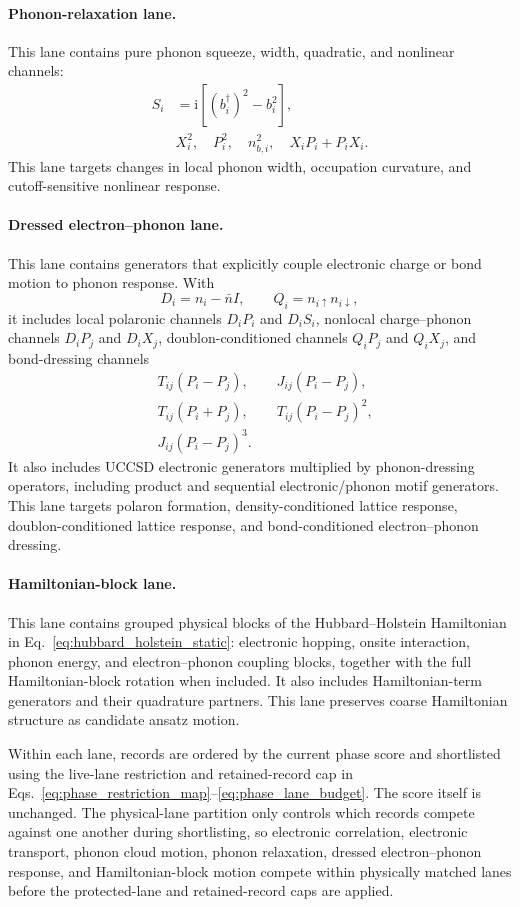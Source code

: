 \documentclass[
  reprint,
  amsmath,
  amssymb,
  aps,
  pra,
  nofootinbib,
  superscriptaddress,
  floatfix
]{revtex4-2}
\newcommand{\ii}{\mathrm{i}}
\begin{document}
\paragraph*{Phonon-relaxation lane.}
This lane contains pure phonon squeeze, width, quadratic, and nonlinear
channels:
\begin{align*}
S_i&=\ii[(b_i^\dagger)^2-b_i^2],\\
&X_i^2,\quad P_i^2,\quad n_{b,i}^2,\quad
X_iP_i+P_iX_i .
\end{align*}
This lane targets changes in local phonon width, occupation curvature, and
cutoff-sensitive nonlinear response.

\paragraph*{Dressed electron--phonon lane.}
This lane contains generators that explicitly couple electronic charge or bond
motion to phonon response. With
\[
D_i=n_i-\bar n I,
\qquad
Q_i=n_{i\uparrow}n_{i\downarrow},
\]
it includes local polaronic channels \(D_iP_i\) and \(D_iS_i\), nonlocal
charge--phonon channels \(D_iP_j\) and \(D_iX_j\), doublon-conditioned channels
\(Q_iP_j\) and \(Q_iX_j\), and bond-dressing channels
\begin{align*}
&T_{ij}(P_i-P_j),
\qquad
J_{ij}(P_i-P_j),\\
&T_{ij}(P_i+P_j),
\qquad
T_{ij}(P_i-P_j)^2,\\
&J_{ij}(P_i-P_j)^3 .
\end{align*}
It also includes UCCSD electronic generators multiplied by phonon-dressing
operators, including product and sequential electronic/phonon motif generators.
This lane targets polaron formation, density-conditioned lattice response,
doublon-conditioned lattice response, and bond-conditioned electron--phonon
dressing.

\paragraph*{Hamiltonian-block lane.}
This lane contains grouped physical blocks of the Hubbard--Holstein Hamiltonian
in Eq.~\eqref{eq:hubbard_holstein_static}: electronic hopping, onsite
interaction, phonon energy, and electron--phonon coupling blocks, together with
the full Hamiltonian-block rotation when included. It also includes
Hamiltonian-term generators and their quadrature partners. This lane preserves
coarse Hamiltonian structure as candidate ansatz motion.

Within each lane, records are ordered by the current phase score and shortlisted
using the live-lane restriction and retained-record cap in
Eqs.~\eqref{eq:phase_restriction_map}--\eqref{eq:phase_lane_budget}. The score
itself is unchanged. The physical-lane partition only controls which records
compete against one another during shortlisting, so electronic correlation,
electronic transport, phonon cloud motion, phonon relaxation, dressed
electron--phonon response, and Hamiltonian-block motion compete within
physically matched lanes before the protected-lane and retained-record caps are
applied.
\end{document}

